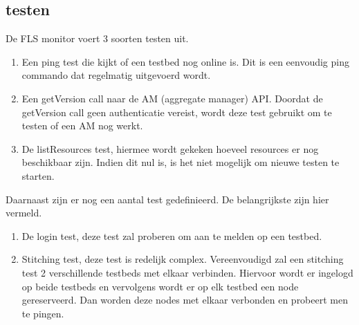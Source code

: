 \subsection{testen}
\npar
De FLS monitor voert 3 soorten testen uit.
\begin{enumerate}
\item Een ping test die kijkt of een testbed nog online is. Dit is een eenvoudig ping commando dat regelmatig uitgevoerd wordt. 
\item Een getVersion call naar de AM (aggregate manager) API. Doordat de getVersion call geen authenticatie vereist, wordt deze test gebruikt om te testen of een AM nog werkt.
\item De listResources test, hiermee wordt gekeken hoeveel resources er nog beschikbaar zijn. Indien dit nul is, is het niet mogelijk om nieuwe testen te starten.
\end{enumerate}
\npar
Daarnaast zijn er nog een aantal test gedefinieerd. De belangrijkste zijn hier vermeld.
\begin{enumerate}
\item De login test, deze test zal proberen om aan te melden op een testbed.
\item Stitching test, deze test is redelijk complex. Vereenvoudigd zal een stitching test 2 verschillende testbeds met elkaar verbinden. Hiervoor wordt er ingelogd op beide testbeds en vervolgens wordt er op elk testbed een node gereserveerd. Dan worden deze nodes met elkaar verbonden en probeert men te pingen. 
\end{enumerate}
\clearpage
